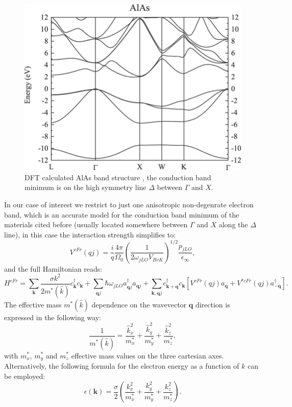 \documentclass[12pt, a4paper]{report}
\numberwithin{equation}{section}
\begin{document}
\begin{figure}[H]
    \centering
    \includegraphics[scale=1.0]{Electronic-band-structure-for-AlAs.jpg}
    \caption{DFT calculated AlAs band structure \cite{da2021pseudopotential}, the conduction band minimum is on the high symmetry 
    line $\Delta$ between $\Gamma$ and $X$.}
    \label{fig:AlAs_bands}
\end{figure}
In our case of interest we restrict to just one anisotropic non-degenrate electron band, which is an accurate model for the conduction band minimum of 
the materials cited before (usually located somewhere between $\Gamma$ and $X$ along the $\Delta$ line), in this case the interaction 
strength simplifies to:
\begin{equation}
    V^{cFr}(qj)=\frac{i}{q}\frac{4\pi}{\Omega_0}\left(\frac{1}{2\omega_{jLO}V_{BvK}}\right)^{1/2}\frac{p_{jLO}}{\epsilon_\infty},
    \label{coupling_strength_anisotropic}
\end{equation}
and the full Hamiltonian reads:
\begin{equation}
    H^{cFr}=\sum_{\mathbf{k}}\frac{\sigma k^2}{2m^*(\hat{k})}c^\dagger_\mathbf{k}c_\mathbf{k}+\sum_{\mathbf{q}j}\hbar\omega_{jLO}a^\dagger_{\mathbf{q}j}a_{\mathbf{q}j}+\sum_{\mathbf{k},\mathbf{q}j}c^\dagger_{\mathbf{k}+\mathbf{q}}c_\mathbf{k}\left[V^{cFr}(qj)a_\mathbf{q}+V^{*cFr}(qj)a^\dagger_\mathbf{-q}\right].
    \label{Froehlich_cubic_k_anisotropic}
\end{equation}
The effective mass $m^*(\hat{k})$ dependence on the wavevector $\mathbf{q}$ direction is expressed in the following way:
\begin{equation}
    \frac{1}{m^*(\hat{k})}=\frac{\hat{k}_x^2}{m^*_x}+\frac{\hat{k}_y^2}{m^*_y}+\frac{\hat{k}_z^2}{m^*_z},
    \label{effective_mass_anisotropic_relation}
\end{equation}
with $m^*_x$, $m^*_y$ and $m^*_z$ effective mass values on the three cartesian axes.\\
Alternatively, the following formula for the electron energy as a function of $k$ can be employed:
\begin{equation}
    \epsilon(\mathbf{k})=\frac{\sigma}{2}\left(\frac{k^2_x}{m^*_x}+\frac{k_y^2}{m^*_y}+\frac{k_z^2}{m^*_z}\right).
\end{equation}
\end{document}
